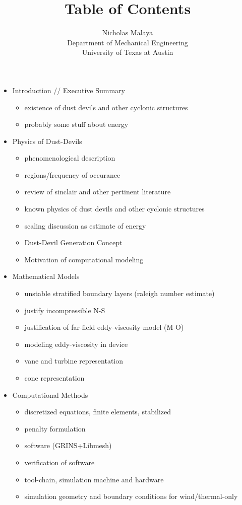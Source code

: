 \documentclass{article}
\title{\bf{Table of Contents}}
\author{Nicholas Malaya \\ Department of Mechanical Engineering \\ University of Texas at Austin} \date{}
\begin{document}
\maketitle

\begin{itemize}
 \item Introduction // Executive Summary
       \begin{itemize}
	\item existence of dust devils and other cyclonic structures
	\item probably some stuff about energy
       \end{itemize}

 \item Physics of Dust-Devils
       \begin{itemize} 
	\item phenomenological description
	\item regions/frequency of occurance
	\item review of sinclair and other pertinent literature
        \item known physics of dust devils and other cyclonic structures
	\item scaling discussion as estimate of energy
	\item Dust-Devil Generation Concept
	\item Motivation of computational modeling
       \end{itemize}

 \item Mathematical Models
       \begin{itemize}
	\item unstable stratified boundary layers (raleigh number estimate)
	\item justify incompressible N-S
	\item justification of far-field eddy-viscosity model (M-O)
	\item modeling eddy-viscosity in device 
	\item vane and turbine representation
	\item cone representation
       \end{itemize}

 \item Computational Methods
       \begin{itemize}
	\item discretized equations, finite elements, stabilized
	\item penalty formulation
	\item software (GRINS+Libmesh)
	\item verification of software
	\item tool-chain, simulation machine and hardware
	\item simulation geometry and boundary conditions for wind/thermal-only
       \end{itemize}


\end{itemize}
\end{document}

